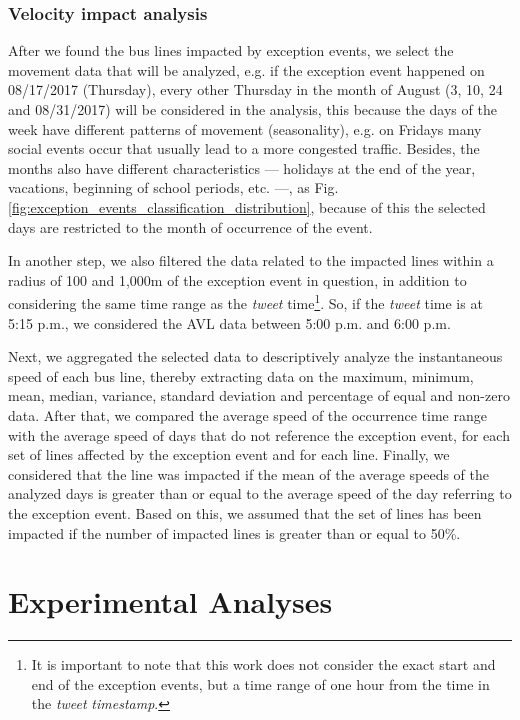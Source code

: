 \documentclass[runningheads]{llncs}
\begin{document}
\subsubsection{Velocity impact analysis}

After we found the bus lines impacted by exception events, we select the movement data that will be analyzed, e.g. if the exception event happened on 08/17/2017 (Thursday), every other Thursday in the month of August (3, 10, 24 and 08/31/2017) will be considered in the analysis, this because the days of the week have different patterns of movement (seasonality), e.g. on Fridays many social events occur that usually lead to a more congested traffic. Besides, the months also have different characteristics --- holidays at the end of the year, vacations, beginning of school periods, etc. ---, as Fig. \ref{fig:exception_events_classification_distribution}, because of this the selected days are restricted to the month of occurrence of the event.

In another step, we also filtered the data related to the impacted lines within a radius of 100 and 1,000m of the exception event in question, in addition to considering the same time range as the \textit{tweet} time\footnote{It is important to note that this work does not consider the exact start and end of the exception events, but a time range of one hour from the time in the \textit{tweet} \textit{timestamp}.}. So, if the \textit {tweet} time is at 5:15 p.m., we considered the AVL data between 5:00 p.m. and 6:00 p.m.

Next, we aggregated the selected data to descriptively analyze the instantaneous speed of each bus line, thereby extracting data on the maximum, minimum, mean, median, variance, standard deviation and percentage of equal and non-zero data. After that, we compared the average speed of the occurrence time range with the average speed of days that do not reference the exception event, for each set of lines affected by the exception event and for each line. Finally, we considered that the line was impacted if the mean of the average speeds of the analyzed days is greater than or equal to the average speed of the day referring to the exception event. Based on this, we assumed that the set of lines has been impacted if the number of impacted lines is greater than or equal to 50\%.


\section{Experimental Analyses}\label{sec:experimentalAnalyses}
\end{document}
